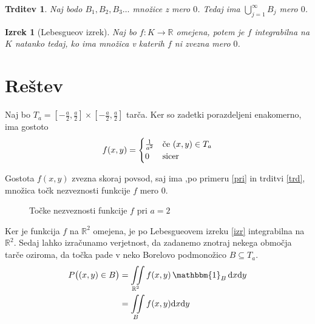 \documentclass{amsart}
\newcommand{\R}{\mathbb{R}}
\theoremstyle{definition} %
\theoremstyle{plain} %
\newtheorem{izrek}[definicija]{Izrek}
\newtheorem{trditev}[definicija]{Trditev}
\newtheorem{posledica}[definicija]{Posledica}
\begin{document}
\begin{trditev}\label{trd}
    Naj bodo $B_1, B_2, B_3 \ldots $ množice z mero $0$. Tedaj ima $\bigcup_{j=1}^{\infty} B_{j}$ mero $0$.
\end{trditev}


\begin{izrek}[Lebesgueov izrek]\label{izr}
    Naj bo $f \colon K \to \R $ omejena, potem je $f$ integrabilna na $K$ natanko tedaj, ko ima množica
    v katerih $f$ ni zvezna mero $0$.
\end{izrek}

\pagebreak

\section{Reštev}

Naj bo $T_a = \left[ -\frac{a}{2} , \frac{a}{2}\right]\times\left[-\frac{a}{2},\frac{a}{2}\right]$
tarča. Ker so zadetki porazdeljeni enakomerno, ima gostoto
\begin{equation*}
    f(x,y) = 
    \begin{cases}
        \frac{1}{a^2} & \text{če $ (x,y) \in T_a  $} \\
        0 & \text{sicer}
    \end{cases}
\end{equation*}

Gostota $f(x,y)$ zvezna skoraj povsod, saj ima ,po primeru \eqref{pri} in trditvi 
\eqref{trd}, množica točk nezveznosti funkcije $f$ mero $0$.
\begin{figure}[!h]
    \centering
    \caption{Točke nezveznosti funkcije $f$ pri $a=2$}
\end{figure}

Ker je funkcija $f$ na $\R^2$ omejena, je po Lebesgueovem izreku \eqref{izr} integrabilna na $\R^2$.
Sedaj lahko izračunamo verjetnost, da zadanemo znotraj nekega območja tarče oziroma, da točka
pade v neko Borelovo podmonožico $B \subseteq T_a$.
\begin{align*}
    P\big((x,y) \in B\big)
    &= \iint\limits_{\R^2} f(x,y) \, \mathbbm{1}_{B} \, \mathrm{d}x\mathrm{d}y \\
    &= \iint\limits_{B} f(x,y) \mathrm{d}x\mathrm{d}y
\end{align*}
\end{document}
